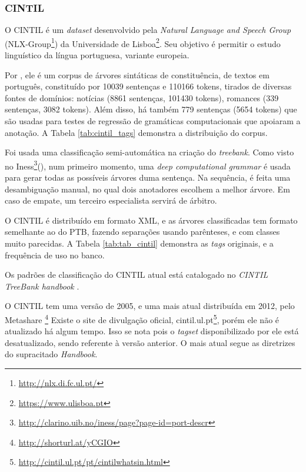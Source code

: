 \subsubsection{CINTIL}
\label{subsec:cintil}
O CINTIL é um \textit{dataset} desenvolvido pela \textit{Natural Language and Speech Group} (NLX-Group\footnote{ \url{http://nlx.di.fc.ul.pt/}}) da Universidade de Lisboa\footnote{\url{https://www.ulisboa.pt}}. Seu objetivo é permitir o estudo linguístico da língua portuguesa, variante europeia.

Por , ele é um corpus de árvores sintáticas de constituência, de textos em português, constituído por 10039 sentenças e 110166 tokens, tirados de diversas fontes de domínios: notícias (8861 sentenças, 101430 tokens), romances (339 sentenças, 3082 tokens). Além disso, há também 779 sentenças (5654 tokens) que são usadas para testes de regressão de gramáticas computacionais que apoiaram a anotação. A Tabela \ref{tab:cintil_tags} demonstra a distribuição do corpus.

\begin{center}

\end{center}

Foi usada uma classificação semi-automática na criação do \textit{treebank}. Como visto no Iness\footnote{\url{http://clarino.uib.no/iness/page?page-id=port-descr}}(), num primeiro momento, uma \textit{deep computational grammar} \cite{lxgram} é usada para gerar todas as possíveis árvores duma sentença. Na sequência, é feita uma desambiguação manual, no qual dois anotadores escolhem a melhor árvore. Em caso de empate, um terceiro especialista servirá de árbitro.

O CINTIL é distribuído em formato XML, e as árvores classificadas tem formato semelhante ao do PTB, fazendo separações usando parênteses, e com classes muito parecidas. A Tabela \ref{tab:tab_cintil} demonstra as \textit{tags} originais, e a frequência de uso no banco.

Os padrões de classificação do CINTIL atual está catalogado no \textit{CINTIL TreeBank handbook} \cite{cintil_handbook}.

O CINTIL tem uma versão de 2005, e uma mais atual distribuída em 2012, pelo Metashare
\footnote{\url{http://shorturl.at/yCGIO}}
Existe o site de divulgação oficial, cintil.ul.pt\footnote{\url{http://cintil.ul.pt/pt/cintilwhatsin.html}}, porém ele não é atualizado há algum tempo. Isso se nota pois o \textit{tagset} disponibilizado por ele está desatualizado, sendo referente à versão anterior. O mais atual segue as diretrizes do supracitado \textit{Handbook}.
